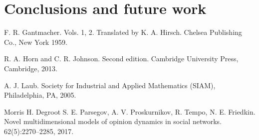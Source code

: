 \documentclass[leqno,12pt]{amsart}
\theoremstyle{remark}
\theoremstyle{remark}
\theoremstyle{remark}
\theoremstyle{definition}
\numberwithin{equation}{section}
\begin{document}
\section{Conclusions and future work}

\begin{thebibliography}{111}

    F. R. Gantmacher.
     Vols. 1, 2. Translated by K. A. Hirsch. Chelsea Publishing Co., New York 1959.

    R. A. Horn and C. R. Johnson.
    \newblock Second edition. Cambridge University Press, Cambridge, 2013.

    A. J. Laub.
     \newblock Society for Industrial and Applied Mathematics (SIAM), Philadelphia, PA, 2005.

     Morris H. Degroot
    S. E. Parsegov, A. V. Proskurnikov, R. Tempo, N. E. Friedkin. \newblock Novel multidimensional models of opinion dynamics in social networks.
     62(5):2270--2285, 2017.

    \end{thebibliography}
\end{document}
